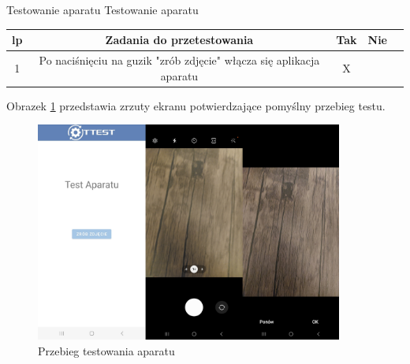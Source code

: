 \begin{tabela}
	{Testowanie aparatu}	%
	{Testowanie aparatu}	%
	{
		\begin{tabular}{|c|c|c|c|c|} \hline
			\textbf{lp} & \textbf{Zadania do przetestowania} & \textbf{Tak} & \textbf{Nie} \\ \hline
			1 & Po naciśnięciu na guzik "zrób zdjęcie" włącza się aplikacja aparatu & X & ~ \\ \hline
	\end{tabular}	}
	\label{tab:tablica_aparat}
\end{tabela}

Obrazek \ref{rys:aparat} przedstawia zrzuty ekranu potwierdzające pomyślny przebieg testu.

\begin{figure}[!hbt]
	\begin{center}
		\includegraphics[angle=360, width=0.90\textwidth]{rys/punkt5/aparat.jpg}
		\caption{Przebieg testowania aparatu}
		\label{rys:aparat}
	\end{center}
\end{figure} 

\newpage

